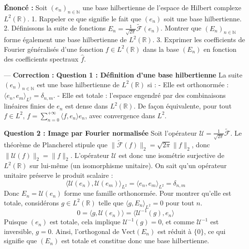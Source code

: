 \documentclass[11pt,a4paper]{article}
\begin{document}
\textbf{Énoncé :}
Soit $(e_n)_{n \in \mathbb{N}}$ une base hilbertienne de l'espace de Hilbert complexe $L^2(\mathbb{R})$.
1. Rappeler ce que signifie le fait que $(e_n)$ soit une base hilbertienne.
2. Définissons la suite de fonctions $E_n = \frac{1}{\sqrt{2\pi}} \widetilde{\mathcal{F}}(e_n)$. Montrer que $(E_n)_{n \in \mathbb{N}}$ forme également une base hilbertienne de $L^2(\mathbb{R})$.
3. Exprimer les coefficients de Fourier généralisés d'une fonction $f \in L^2(\mathbb{R})$ dans la base $(E_n)$ en fonction des coefficients spectraux $\hat{f}$.

---
\textbf{Correction :}
\textbf{Question 1 : Définition d'une base hilbertienne}
La suite $(e_n)_{n \in \mathbb{N}}$ est une base hilbertienne de $L^2(\mathbb{R})$ si :
- Elle est orthonormée : $\langle e_n, e_m \rangle_{L^2} = \delta_{n,m}$.
- Elle est totale : l'espace engendré par des combinaisons linéaires finies de $e_n$ est dense dans $L^2(\mathbb{R})$. De façon équivalente, pour tout $f \in L^2$, $f = \sum_{n=0}^{+\infty} \langle f, e_n \rangle e_n$, avec convergence dans $L^2$.

\textbf{Question 2 : Image par Fourier normalisée}
Soit l'opérateur $\mathcal{U} = \frac{1}{\sqrt{2\pi}} \widetilde{\mathcal{F}}$. Le théorème de Plancherel stipule que $\|\widetilde{\mathcal{F}}(f)\|_2 = \sqrt{2\pi}\|f\|_2$, donc $\|\mathcal{U}(f)\|_2 = \|f\|_2$.
L'opérateur $\mathcal{U}$ est donc une isométrie surjective de $L^2(\mathbb{R})$ sur lui-même (un isomorphisme unitaire).
On sait qu'un opérateur unitaire préserve le produit scalaire :
$$ \langle \mathcal{U}(e_n), \mathcal{U}(e_m) \rangle_{L^2} = \langle e_n, e_m \rangle_{L^2} = \delta_{n,m} $$
Donc $E_n = \mathcal{U}(e_n)$ forme une famille orthonormée.
Pour montrer qu'elle est totale, considérons $g \in L^2(\mathbb{R})$ telle que $\langle g, E_n \rangle_{L^2} = 0$ pour tout $n$.
$$ 0 = \langle g, \mathcal{U}(e_n) \rangle = \langle \mathcal{U}^{-1}(g), e_n \rangle $$
Puisque $(e_n)$ est totale, cela implique $\mathcal{U}^{-1}(g) = 0$, et comme $\mathcal{U}^{-1}$ est inversible, $g = 0$.
Ainsi, l'orthogonal de $\text{Vect}(E_n)$ est réduit à $\{0\}$, ce qui signifie que $(E_n)$ est totale et constitue donc une base hilbertienne.
\end{document}
